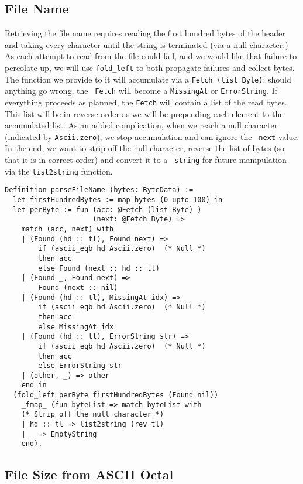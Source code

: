 \documentclass[nocopyrightspace]{sigplanconf}
\begin{document}
\subsection{File Name}

Retrieving the file name requires reading the first hundred bytes of the
header and taking every character until the string is terminated (via a null
character.) As each attempt to read from the file could fail, and we would
like that failure to percolate up, we will use {\tt fold\_left} to both
propagate failures and collect bytes. The function we provide to it will
accumulate via a {\tt Fetch (list Byte)}; should anything go wrong, the {\tt
Fetch} will become a {\tt MissingAt} or {\tt ErrorString}. If everything
proceeds as planned, the {\tt Fetch} will contain a list of the read bytes.
This list will be in reverse order as we will be prepending each element to
the accumulated list. As an added complication, when we reach a null character
(indicated by {\tt Ascii.zero}), we stop accumulation and can ignore the {\tt
next} value. In the end, we want to strip off the null character, reverse the
list of bytes (so that it is in correct order) and convert it to a {\tt
string} for future manipulation via the {\tt list2string} function.

\begin{lstlisting}
Definition parseFileName (bytes: ByteData) :=
  let firstHundredBytes := map bytes (0 upto 100) in
  let perByte := fun (acc: @Fetch (list Byte) )
                     (next: @Fetch Byte) =>
    match (acc, next) with
    | (Found (hd :: tl), Found next) =>
        if (ascii_eqb hd Ascii.zero)  (* Null *)
        then acc
        else Found (next :: hd :: tl)
    | (Found _, Found next) =>
        Found (next :: nil)
    | (Found (hd :: tl), MissingAt idx) =>
        if (ascii_eqb hd Ascii.zero)  (* Null *)
        then acc
        else MissingAt idx
    | (Found (hd :: tl), ErrorString str) =>
        if (ascii_eqb hd Ascii.zero)  (* Null *)
        then acc
        else ErrorString str
    | (other, _) => other
    end in
  (fold_left perByte firstHundredBytes (Found nil)) 
    _fmap_ (fun byteList => match byteList with
    (* Strip off the null character *)
    | hd :: tl => list2string (rev tl)
    | _ => EmptyString
    end).
\end{lstlisting}


\subsection{File Size from ASCII Octal}
\end{document}

